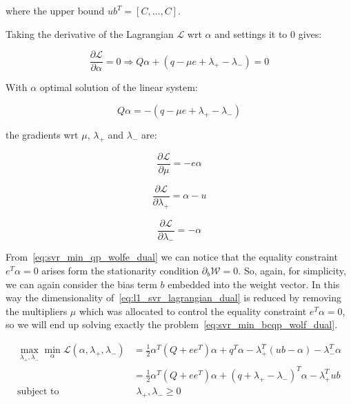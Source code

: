 where the upper bound $ub^T = [C, \dots, C]$.

Taking the derivative of the Lagrangian $\mathcal{L}$ wrt $\alpha$ and settings it to 0 gives:

\begin{equation} \label{eq:svr_lagrangian_der_a}
	\frac{\partial \mathcal{L}}{\partial \alpha}=0\Rightarrow Q \alpha + (q - \mu e + \lambda_+ - \lambda_-) = 0
\end{equation}

With $\alpha$ optimal solution of the linear system:

\begin{equation} \label{eq:l1_svr_lagrangian_sol}
    Q \alpha = - (q - \mu e + \lambda_+ - \lambda_-)
\end{equation}

the gradients wrt $\mu$, $\lambda_+$ and $\lambda_-$ are:

\begin{equation} \label{eq:svr_lagrangian_der_mu}
	\frac{\partial \mathcal{L}}{\partial \mu}=-e \alpha
\end{equation}

\begin{equation} \label{eq:svr_lagrangian_der_lp}
	\frac{\partial \mathcal{L}}{\partial \lambda_+}=\alpha - u
\end{equation}

\begin{equation} \label{eq:svr_lagrangian_der_lm}
    \frac{\partial \mathcal{L}}{\partial \lambda_-}=-\alpha
\end{equation}

From~\eqref{eq:svr_min_qp_wolfe_dual} we can notice that the equality constraint $e^T \alpha = 0$ arises form the stationarity condition $\partial_{{b}} \mathcal{W}=0$. So, again, for simplicity, we can again consider the bias term $b$ embedded into the weight vector. In this way the dimensionality of~\eqref{eq:l1_svr_lagrangian_dual} is reduced by removing the multipliers $\mu$ which was allocated to control the equality constraint $e^T \alpha=0$, so we will end up solving exactly the problem~\eqref{eq:svr_min_bcqp_wolf_dual}.

\begin{equation} \label{eq:l1_svr_bcqp_lagrangian_dual}
	\begin{aligned}
    	\max_{\lambda_+,\lambda_-} \min_{\alpha} \mathcal{L}(\alpha,\lambda_+,\lambda_-) &= \frac{1}{2} \alpha^T (Q + ee^T)\alpha+q^T\alpha - \lambda_+^T (ub - \alpha) - \lambda_-^T \alpha \\
    &= \frac{1}{2} \alpha^T (Q + ee^T)\alpha + (q + \lambda_+ - \lambda_-)^T \alpha - \lambda_+^T ub \\
    \text{subject to} \quad & \,\, \lambda_+, \lambda_- \geq 0
	\end{aligned}
\end{equation}

